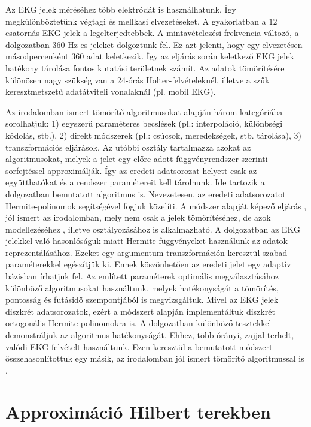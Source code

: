 \documentclass[oneside,titlepage,12pt,a4paper]{report}
\begin{document}
Az EKG jelek méréséhez több elektródát is használhatunk. Így megkülönböztetünk végtagi és mellkasi elvezetéseket. A gyakorlatban a $12$ csatornás EKG jelek a legelterjedtebbek. A mintavételezési frekvencia változó, a dolgozatban $360$ Hz-es jeleket dolgoztunk fel. Ez azt jelenti, hogy egy elvezetésen másodpercenként $360$ adat keletkezik. Így az eljárás során keletkező EKG jelek hatékony tárolása fontos kutatási területnek számít. Az adatok tömörítésére különösen nagy szükség van a 24-órás Holter-felvételeknél, illetve a szűk keresztmetszetű adatátviteli vonalaknál (pl. mobil EKG). 

Az irodalomban ismert tömörítő algoritmusokat \cite{unifiedReview} alapján három kategóriába sorolhatjuk: 1) egyszerű paraméteres becslések (pl.: interpoláció, különbségi kódolás, stb.), 2) direkt módszerek (pl.: csúcsok, meredekségek, stb. tárolása), 3) transzformációs eljárások. Az utóbbi osztály tartalmazza azokat az algoritmusokat, melyek a jelet egy előre adott függvényrendszer szerinti sorfejtéssel approximálják. Így az eredeti adatsorozat helyett csak az együtthatókat és a rendszer paramétereit kell tárolnunk. Ide tartozik a dolgozatban bemutatott algoritmus is. Nevezetesen, az eredeti adatsorozatot Hermite-polinomok segítségével fogjuk közelíti. A módszer alapját képező eljárás \cite{hexp3}, jól ismert az irodalomban, mely nem csak a jelek tömörítéséhez, de azok modellezéséhez \cite{hexp2}, illetve osztályozásához \cite{hexp1, hexp4} is alkalmazható. A dolgozatban az EKG jelekkel való hasonlóságuk miatt Hermite-függvényeket használunk az adatok reprezentálásához. Ezeket egy argumentum transzformáción keresztül szabad paraméterekkel egészítjük ki. Ennek köszönhetően az eredeti jelet egy adaptív bázisban írhatjuk fel. Az említett paraméterek optimális megválasztásához különböző algoritmusokat használtunk, melyek hatékonyságát a tömörítés, pontosság és futásidő szempontjából is megvizsgáltuk. Mivel az EKG jelek diszkrét adatsorozatok, ezért a módszert \cite{hexp5} alapján implementáltuk diszkrét ortogonális Hermite-polinomokra is. A dolgozatban különböző tesztekkel demonstráljuk az algoritmus hatékonyságát. Ehhez, több órányi, zajjal terhelt, valódi EKG felvételt használtunk. Ezen keresztül a bemutatott módszert összehasonlítottuk egy másik, az irodalomban jól ismert tömörítő algoritmussal is \cite{jpeg2000ECG}. 


\chapter{ Approxim\'aci\'o  Hilbert terekben }
\end{document}
